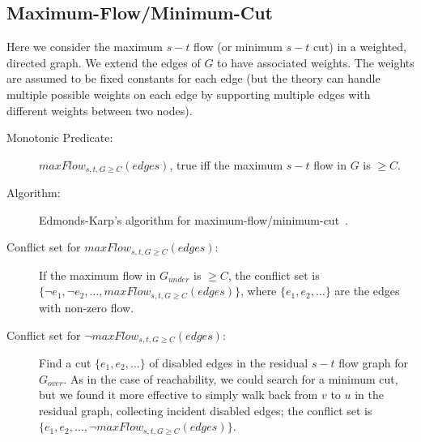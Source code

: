 \documentclass[runningheads]{llncs}
\newcommand{\gunder}{G_{under}}
\newcommand{\gover}{G_{over}}
\begin{document}
\subsection{{Maximum-Flow/Minimum-Cut}}
Here we consider the maximum $s-t$ flow (or minimum
$s-t$ cut) in a weighted, directed graph. We extend the edges of $G$ to have associated weights. The
weights are assumed to be fixed constants for each edge (but the theory
can handle multiple possible weights on each edge by
supporting multiple edges with different weights between two nodes).

\begin{description}
\item[Monotonic Predicate:] $maxFlow_{s,t,G \geq C}(edges)$, true iff the maximum $s-t$ flow in $G$ is $\geq C$.
\item[Algorithm:] Edmonds-Karp's algorithm for maximum-flow/minimum-cut~\cite{edmonds1972theoretical}.
\item[Conflict set for $maxFlow_{s,t,G \geq C}(edges)$:]  If the maximum flow
in $\gunder$ is $\geq C$,
the conflict set is $\{\lnot e_1, \lnot e_2, \ldots, maxFlow_{s,t,G \geq C}(edges)\}$, where $\{e_1, e_2, \ldots\}$ are the edges with non-zero flow.
\item[Conflict set for $\lnot maxFlow_{s,t,G \geq C}(edges)$:] Find a cut
$\{e_1,e_2,\ldots\}$ of disabled edges in the residual $s-t$ flow graph
for $\gover$. As in the case of reachability, we could search for a
minimum cut, but we found it more effective to simply walk back
from $v$ to $u$ in the residual graph, collecting incident disabled edges;
the conflict set is $\{e_1, e_2, \ldots, \lnot maxFlow_{s,t,G \geq C}(edges)\}$.
\end{description}
\end{document}
